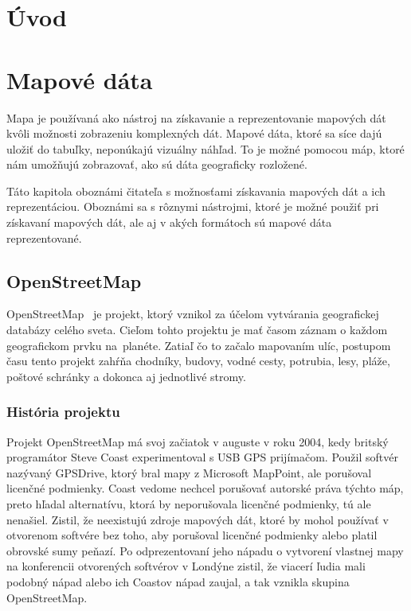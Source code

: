 

\chapter{Úvod}



\chapter{Mapové dáta}
\label{map-data}
Mapa je používaná ako nástroj na získavanie a reprezentovanie mapových dát kvôli možnosti zobrazeniu komplexných dát. Mapové dáta, ktoré sa síce dajú uložiť do tabuľky, neponúkajú vizuálny náhľad. To je možné pomocou máp, ktoré nám umožňujú zobrazovať, ako sú dáta geograficky rozložené.

Táto kapitola oboznámi čitateľa s možnosťami získavania mapových dát a ich reprezentáciou. Oboznámi sa s rôznymi nástrojmi, ktoré je možné použiť pri získavaní mapových dát, ale aj v akých formátoch sú mapové dáta reprezentované.


\section{OpenStreetMap}
OpenStreetMap~\cite{openstreet} je projekt, ktorý vznikol za účelom vytvárania geografickej databázy celého sveta. Cieľom tohto projektu je mať časom záznam o každom geografickom prvku na~planéte. Zatiaľ čo to začalo mapovaním ulíc, postupom času tento projekt zahŕňa chodníky, budovy, vodné cesty, potrubia, lesy, pláže, poštové schránky a dokonca aj jednotlivé stromy.

\subsection{História projektu}
Projekt OpenStreetMap má svoj začiatok v auguste v roku 2004, kedy britský programátor Steve Coast experimentoval s USB GPS prijímačom. Použil softvér nazývaný GPSDrive, ktorý bral mapy z Microsoft MapPoint, ale porušoval licenčné podmienky. Coast vedome nechcel porušovať autorské práva týchto máp, preto hľadal alternatívu, ktorá by neporušovala licenčné podmienky, tú ale nenašiel. Zistil, že neexistujú zdroje mapových dát, ktoré by mohol používať v otvorenom softvére bez toho, aby porušoval licenčné podmienky alebo platil obrovské sumy peňazí. Po odprezentovaní jeho nápadu o vytvorení vlastnej mapy na konferencii otvorených softvérov v Londýne zistil, že viacerí ľudia mali podobný nápad alebo ich Coastov nápad zaujal, a tak vznikla skupina OpenStreetMap.

